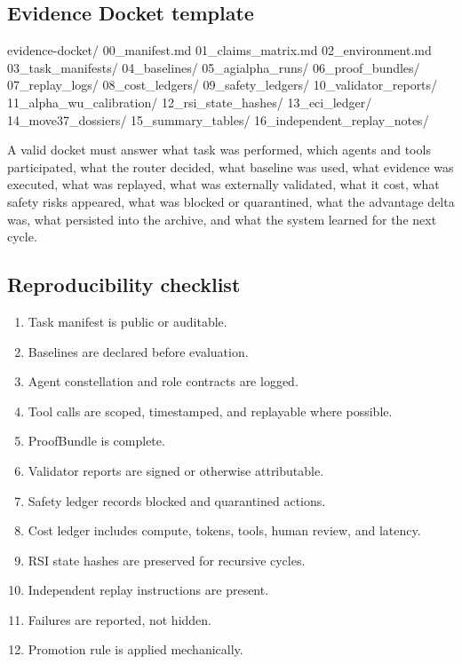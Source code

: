 \documentclass[
  11pt,
]{article}
\newenvironment{Shaded}{}{}
\newcommand{\NormalTok}[1]{#1}
\providecommand{\tightlist}{%
  \setlength{\itemsep}{0pt}\setlength{\parskip}{0pt}}
\begin{document}
\subsection{Evidence Docket template}\label{evidence-docket-template}

\begin{Shaded}
\begin{Highlighting}[]
\NormalTok{evidence{-}docket/}
\NormalTok{00\_manifest.md}
\NormalTok{01\_claims\_matrix.md}
\NormalTok{02\_environment.md}
\NormalTok{03\_task\_manifests/}
\NormalTok{04\_baselines/}
\NormalTok{05\_agialpha\_runs/}
\NormalTok{06\_proof\_bundles/}
\NormalTok{07\_replay\_logs/}
\NormalTok{08\_cost\_ledgers/}
\NormalTok{09\_safety\_ledgers/}
\NormalTok{10\_validator\_reports/}
\NormalTok{11\_alpha\_wu\_calibration/}
\NormalTok{12\_rsi\_state\_hashes/}
\NormalTok{13\_eci\_ledger/}
\NormalTok{14\_move37\_dossiers/}
\NormalTok{15\_summary\_tables/}
\NormalTok{16\_independent\_replay\_notes/}
\end{Highlighting}
\end{Shaded}

A valid docket must answer what task was performed, which agents and
tools participated, what the router decided, what baseline was used,
what evidence was executed, what was replayed, what was externally
validated, what it cost, what safety risks appeared, what was blocked or
quarantined, what the advantage delta was, what persisted into the
archive, and what the system learned for the next cycle.

\subsection{Reproducibility checklist}\label{reproducibility-checklist}

\begin{enumerate}
\def\labelenumi{\arabic{enumi}.}
\tightlist
\item
  Task manifest is public or auditable.
\item
  Baselines are declared before evaluation.
\item
  Agent constellation and role contracts are logged.
\item
  Tool calls are scoped, timestamped, and replayable where possible.
\item
  ProofBundle is complete.
\item
  Validator reports are signed or otherwise attributable.
\item
  Safety ledger records blocked and quarantined actions.
\item
  Cost ledger includes compute, tokens, tools, human review, and
  latency.
\item
  RSI state hashes are preserved for recursive cycles.
\item
  Independent replay instructions are present.
\item
  Failures are reported, not hidden.
\item
  Promotion rule is applied mechanically.
\end{enumerate}
\end{document}
